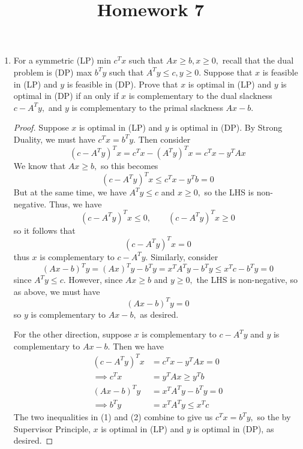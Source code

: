 \documentclass{article}
\begin{document}
\title{Homework 7}
\maketitle
\thispagestyle{fancy}

\begin{enumerate}
	\item For a symmetric (LP) min $c^T x$ such that $Ax\ge b, x\ge 0,$ recall that the dual problem is (DP) max $b^T y$ such that $A^T y\le c, y\ge 0.$ Suppose that $x$ is feasible in (LP) and $y$ is feasible in (DP). Prove that $x$ is optimal in (LP) and $y$ is optimal in (DP) if an only if $x$ is complementary to the dual slackness $c-A^T y,$ and $y$ is complementary to the primal slackness $Ax-b.$
		\begin{proof}
			Suppose $x$ is optimal in (LP) and $y$ is optimal in (DP). By Strong Duality, we must have $c^Tx = b^T y.$ Then consider \[(c-A^T y)^T x = c^Tx - (A^T y)^T x = c^T x - y^T Ax\] We know that $Ax\ge b,$ so this becomes \[(c-A^T y)^T x\le c^T x - y^Tb = 0\] But at the same time, we have $A^Ty\le c$ and $x\ge 0,$ so the LHS is non-negative. Thus, we have \[(c-A^T y)^T x \le 0, \quad\quad (c-A^Ty)^T x\ge 0\] so it follows that \[(c-A^Ty)^T x = 0\] thus $x$ is complementary to $c-A^T y.$
			Similarly, consider \[(Ax-b)^T y = (Ax)^Ty - b^T y = x^T A^T y - b^T y \le x^T c - b^T y = 0\] since $A^T y\le c.$ However, since $Ax\ge b$ and $y\ge 0,$ the LHS is non-negative, so as above, we must have \[(Ax-b)^T y = 0\] so $y$ is complementary to $Ax-b,$ as desired.

			For the other direction, suppose $x$ is complementary to $c-A^T y$ and $y$ is complementary to $Ax-b.$ Then we have
			\begin{align*}
				(c-A^T y)^T x &= c^T x - y^T Ax = 0 \\
				\tag{1}\implies c^T x &= y^T Ax \ge y^T b \\
				(Ax-b)^T y&= x^T A^T y - b^T y = 0 \\
				\tag{2}\implies b^T y &= x^T A^T y\le x^T c
			\end{align*}
			The two inequalities in (1) and (2) combine to give us $c^T x = b^T y,$ so the by Supervisor Principle, $x$ is optimal in (LP) and $y$ is optimal in (DP), as desired.

		\end{proof}


\end{enumerate}
\end{document}
